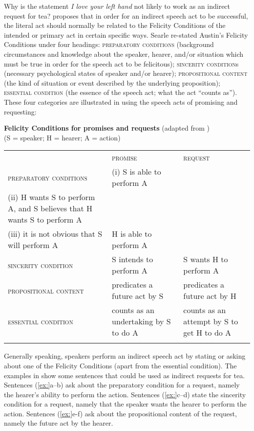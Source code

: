 Why is the statement \textit{I love your left hand} not likely to work as an indirect request for tea? \citet{Searle1969,Searle1975} proposes that in order for an indirect speech act to be successful, the literal act should normally be related to the Felicity Conditions of the intended or primary act in certain specific ways. Searle re-stated Austin’s Felicity Conditions under four headings: \textsc{preparatory conditions} (background circumstances and knowledge about the speaker, hearer, and/or situation which must be true in order for the speech act to be felicitous); \textsc{sincerity condition}s (necessary psychological states of speaker and/or hearer); \textsc{propositional content} (the kind of situation or event described by the underlying proposition); \textsc{essential condition} (the essence of the speech act; what the act “counts as”). These four categories are illustrated in  using the speech acts of promising and requesting:


\ea
\textbf{Felicity Conditions for promises and requests} (adapted from \citealt{Searle1969,Searle1975})\\
(S = speaker; H = hearer; A = action)
\z

\begin{tabularx}{\textwidth}{XXX} & \scshape promise & \scshape request\\
\lsptoprule
\scshape preparatory conditions & (i) S is able to perform A\\
(ii) H wants S to perform A, and S believes that H wants S to perform A\\
(iii) it is not obvious that S will perform A & H is able to perform A\\
\scshape sincerity condition & S intends to perform A & S wants H to perform A\\
\scshape propositional content & predicates a future act by S & predicates a future act by H\\
\scshape essential condition & counts as an undertaking by S to do A & counts as an attempt by S to get H to do A\\
\lspbottomrule
\end{tabularx}

Generally speaking, speakers perform an indirect speech act by stating or asking about one of the Felicity Conditions (apart from the essential condition). The examples in  show some sentences that could be used as indirect requests for tea. Sentences (\ref{ex:}a--b) ask about the preparatory condition for a request, namely the hearer’s ability to perform the action. Sentences (\ref{ex:}c--d) state the sincerity condition for a request, namely that the speaker wants the hearer to perform the action. Sentences (\ref{ex:}e-f) ask about the propositional content of the request, namely the future act by the hearer.



